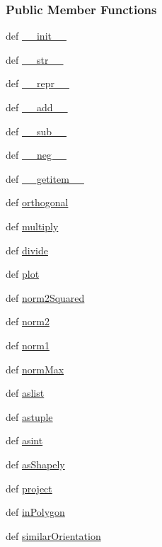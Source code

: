 \subsubsection*{Public Member Functions}
\begin{DoxyCompactItemize}
\item 
def \hyperlink{classmoving_1_1Point_a44fc2d3b55f809577f3a6bb682e2ac5a}{\-\_\-\-\_\-init\-\_\-\-\_\-}
\item 
def \hyperlink{classmoving_1_1Point_a4aeb02318ecf00cd139bb2690c5fb8d2}{\-\_\-\-\_\-str\-\_\-\-\_\-}
\item 
def \hyperlink{classmoving_1_1Point_a61d7f277059d4f876f2f63af6ebaf122}{\-\_\-\-\_\-repr\-\_\-\-\_\-}
\item 
def \hyperlink{classmoving_1_1Point_a1e7a55f11fc6bd0ff3d25794933aee16}{\-\_\-\-\_\-add\-\_\-\-\_\-}
\item 
def \hyperlink{classmoving_1_1Point_aee55a8400abb5b4aaf1b0b1deceef2fe}{\-\_\-\-\_\-sub\-\_\-\-\_\-}
\item 
def \hyperlink{classmoving_1_1Point_a1a5018439473fe5c295245e022f0682e}{\-\_\-\-\_\-neg\-\_\-\-\_\-}
\item 
def \hyperlink{classmoving_1_1Point_a7ab2de1feab8f960cd963352f57e047e}{\-\_\-\-\_\-getitem\-\_\-\-\_\-}
\item 
def \hyperlink{classmoving_1_1Point_a89770895dc0dc2dbea37104a8500bc26}{orthogonal}
\item 
def \hyperlink{classmoving_1_1Point_ad5cbbe55eb76ed3c749cd431955ff0ad}{multiply}
\item 
def \hyperlink{classmoving_1_1Point_a4f37011f7c4a200e52d8278d44a093dc}{divide}
\item 
def \hyperlink{classmoving_1_1Point_a6eeb0e3d7ed0425614b8c95cee2a6235}{plot}
\item 
def \hyperlink{classmoving_1_1Point_adbf64130bc95de49330a03fbac10fb66}{norm2\-Squared}
\item 
def \hyperlink{classmoving_1_1Point_a6c886e2c4036aa68e4128a49269cf0d3}{norm2}
\item 
def \hyperlink{classmoving_1_1Point_a217a1b9694d93310381337ac8360bb91}{norm1}
\item 
def \hyperlink{classmoving_1_1Point_ae3975fff4392ed5d3eff3f366e7b2203}{norm\-Max}
\item 
def \hyperlink{classmoving_1_1Point_a84443e6f0f9c93a91d7b0a9c3ad2b8ca}{aslist}
\item 
def \hyperlink{classmoving_1_1Point_adf4eefc6393071a3b2381e7604abd742}{astuple}
\item 
def \hyperlink{classmoving_1_1Point_acaedde5a5de00853cd4c0cad4d58e42d}{asint}
\item 
def \hyperlink{classmoving_1_1Point_a51a718adc29d293ea0747287f3e21332}{as\-Shapely}
\item 
def \hyperlink{classmoving_1_1Point_ab113bf45dca9c7ef476e771a0f398538}{project}
\item 
def \hyperlink{classmoving_1_1Point_a72eb10d472f2c5d2af3362f9e82d65ba}{in\-Polygon}
\item 
def \hyperlink{classmoving_1_1Point_a932d2589d44ab0404b0df32e29b28332}{similar\-Orientation}
\end{DoxyCompactItemize}
